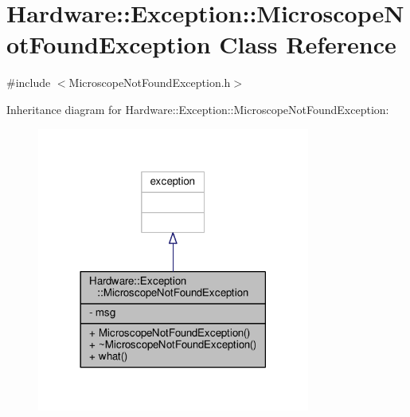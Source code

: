 \hypertarget{class_hardware_1_1_exception_1_1_microscope_not_found_exception}{}\section{Hardware\+:\+:Exception\+:\+:Microscope\+Not\+Found\+Exception Class Reference}
\label{class_hardware_1_1_exception_1_1_microscope_not_found_exception}


{\ttfamily \#include $<$Microscope\+Not\+Found\+Exception.\+h$>$}



Inheritance diagram for Hardware\+:\+:Exception\+:\+:Microscope\+Not\+Found\+Exception\+:\nopagebreak
\begin{figure}[H]
\begin{center}
\leavevmode
\includegraphics[width=254pt]{class_hardware_1_1_exception_1_1_microscope_not_found_exception__inherit__graph}
\end{center}
\end{figure}


